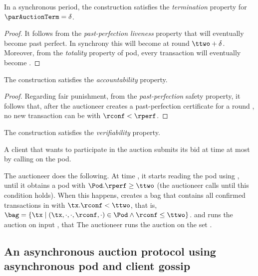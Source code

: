 \begin{theorem}[Termination within $\parAuctionTerm = \delta$]
    In a synchronous period, the construction satisfies the \emph{termination} property for $\parAuctionTerm = \delta$. 
\end{theorem}
\begin{proof}
    It follows from the \emph{past-perfection liveness} property that
    \ttwo will eventually become past perfect.
    In synchrony this will become at round $\ttwo + \delta$.
    Moreover, from the \emph{totality} property of pod, every \pend transaction will eventually become \confirmed. 
\end{proof}

\begin{theorem}[Accountability]
    The construction satisfies the \emph{accountability} property.
\end{theorem}
\begin{proof}
    Regarding fair punishment,
    from the \emph{past-perfection} safety property, it follows that, after the auctioneer creates a past-perfection certificate \ppcert for a round \rperf,
    no new transaction can be \confirmed with $\rconf < \rperf$.
\end{proof}

\begin{theorem}[Verifiability]
    The construction satisfies the \emph{verifiability} property.
\end{theorem}


\begin{construction}\label{const:auction-sync-gossip}
    A client that wants to participate in the auction submits its bid \bid at time at most \tone by calling \opwrite{\tx} on the pod.
    
    The auctioneer does the following. At time \ttwo, it starts reading the pod using \opreadall{}, until it obtains a pod \Pod with $\Pod.\rperf \geq \ttwo$ (the auctioneer calls \opreadall{} until this condition holds).
    When this happens, \auc creates a bag \bag that contains all confirmed transactions \tx in \Pod with $\tx.\rconf < \ttwo$, that is,$\bag = \{ \tx \mid (\tx, \cdot, \cdot, \rconf, \cdot) \in \Pod \land \rconf \leq \ttwo \}$. and runs the auction on input \bag, that The auctioneer runs the auction on the set \bag.        
    \end{construction}



\subsection{An asynchronous auction protocol using asynchronous pod and client gossip}
